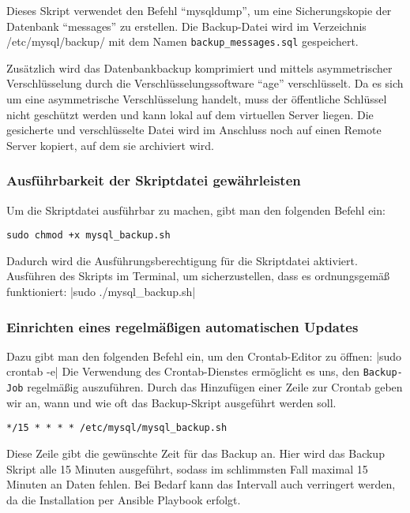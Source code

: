Dieses Skript verwendet den Befehl \enquote{mysqldump}, um eine Sicherungskopie der Datenbank \enquote{messages} zu erstellen. 
Die Backup-Datei wird im Verzeichnis /etc/mysql/backup/ mit dem Namen \verb+backup_messages.sql+ gespeichert.

Zusätzlich wird das Datenbankbackup komprimiert und mittels asymmetrischer Verschlüsselung durch die Verschlüsselungssoftware \enquote{age} verschlüsselt. Da es sich um eine asymmetrische Verschlüsselung handelt, muss der öffentliche Schlüssel nicht geschützt werden und kann lokal auf dem virtuellen Server liegen. Die gesicherte und verschlüsselte Datei wird im Anschluss noch auf einen Remote Server kopiert, auf dem sie archiviert wird.

\subsubsection*{Ausführbarkeit der Skriptdatei gewährleisten}

Um die Skriptdatei ausführbar zu machen, gibt man den folgenden Befehl ein:
\begin{verbatim}sudo chmod +x mysql_backup.sh \end{verbatim}
Dadurch wird die Ausführungsberechtigung für die Skriptdatei aktiviert.
Ausführen des Skripts im Terminal, um sicherzustellen, dass es ordnungsgemäß funktioniert:
|sudo ./mysql_backup.sh|

\subsubsection*{Einrichten eines regelmäßigen automatischen Updates}

Dazu gibt man den folgenden Befehl ein, um den Crontab-Editor zu öffnen:
|sudo crontab -e|
Die Verwendung des Crontab-Dienstes ermöglicht es uns, den \verb+Backup-Job+ regelmäßig auszuführen. Durch das Hinzufügen einer Zeile zur Crontab geben wir an, wann und wie oft das Backup-Skript ausgeführt werden soll. 

\begin{verbatim}*/15 * * * * /etc/mysql/mysql_backup.sh\end{verbatim}

Diese Zeile gibt die gewünschte Zeit für das Backup an. Hier wird das Backup Skript alle 15 Minuten ausgeführt, sodass im schlimmsten Fall maximal 15 Minuten an Daten fehlen. Bei Bedarf kann das Intervall auch verringert werden, da die Installation per Ansible Playbook erfolgt.

